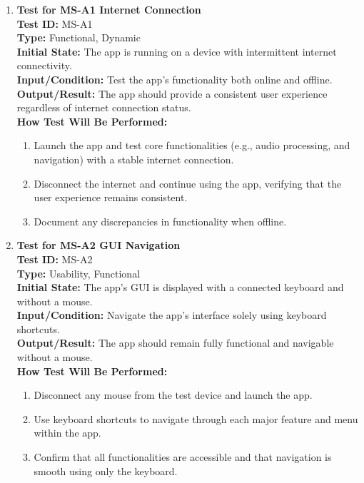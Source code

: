 \documentclass[12pt, titlepage]{article}
\begin{document}
\begin{enumerate}
    \item \textbf{Test for MS-A1 Internet Connection} \\
      \newline
      \textbf{Test ID:} MS-A1 \\
      \textbf{Type:} Functional, Dynamic \\
      \textbf{Initial State:} The app is running on a device with intermittent internet connectivity. \\
      \textbf{Input/Condition:} Test the app’s functionality both online and offline. \\
      \textbf{Output/Result:} The app should provide a consistent user experience regardless of internet connection status. \\
      \textbf{How Test Will Be Performed:}
      \begin{enumerate}
          \item Launch the app and test core functionalities (e.g., audio processing, and navigation) with a stable internet connection.
          \item Disconnect the internet and continue using the app, verifying that the user experience remains consistent.
          \item Document any discrepancies in functionality when offline.
      \end{enumerate}

    \item \textbf{Test for MS-A2 GUI Navigation} \\
      \newline
      \textbf{Test ID:} MS-A2 \\
      \textbf{Type:} Usability, Functional \\
      \textbf{Initial State:} The app’s GUI is displayed with a connected keyboard and without a mouse. \\
      \textbf{Input/Condition:} Navigate the app’s interface solely using keyboard shortcuts. \\
      \textbf{Output/Result:} The app should remain fully functional and navigable without a mouse. \\
      \textbf{How Test Will Be Performed:}
      \begin{enumerate}
          \item Disconnect any mouse from the test device and launch the app.
          \item Use keyboard shortcuts to navigate through each major feature and menu within the app.
          \item Confirm that all functionalities are accessible and that navigation is smooth using only the keyboard.
      \end{enumerate}
\end{enumerate}
\end{document}
